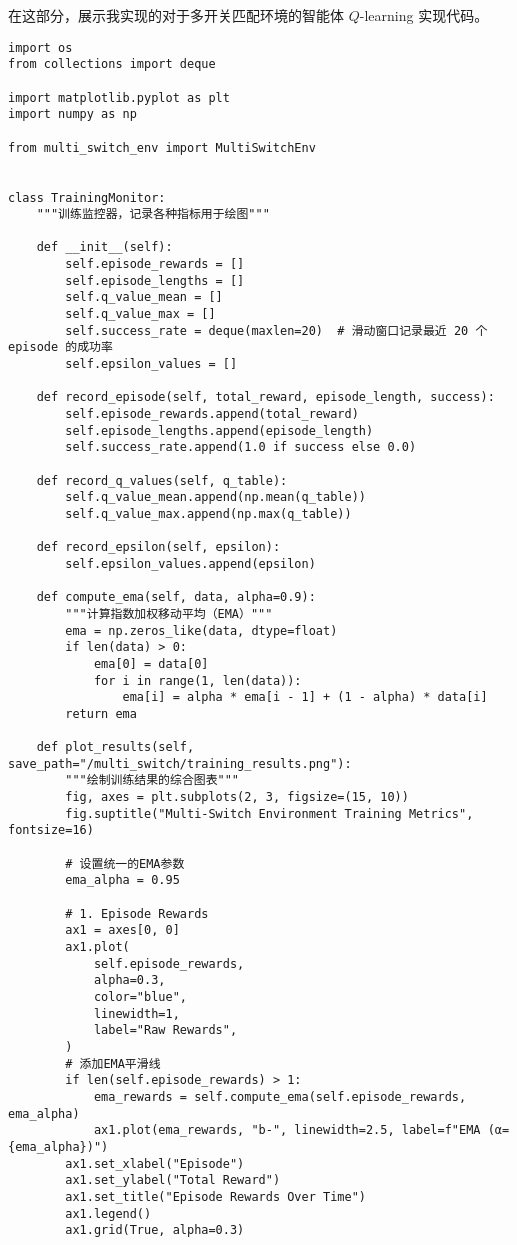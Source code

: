 在这部分，展示我实现的对于多开关匹配环境的智能体 \(Q\)-learning 实现代码。

\begin{verbatim}
import os
from collections import deque

import matplotlib.pyplot as plt
import numpy as np

from multi_switch_env import MultiSwitchEnv


class TrainingMonitor:
    """训练监控器，记录各种指标用于绘图"""

    def __init__(self):
        self.episode_rewards = []
        self.episode_lengths = []
        self.q_value_mean = []
        self.q_value_max = []
        self.success_rate = deque(maxlen=20)  # 滑动窗口记录最近 20 个 episode 的成功率
        self.epsilon_values = []

    def record_episode(self, total_reward, episode_length, success):
        self.episode_rewards.append(total_reward)
        self.episode_lengths.append(episode_length)
        self.success_rate.append(1.0 if success else 0.0)

    def record_q_values(self, q_table):
        self.q_value_mean.append(np.mean(q_table))
        self.q_value_max.append(np.max(q_table))

    def record_epsilon(self, epsilon):
        self.epsilon_values.append(epsilon)

    def compute_ema(self, data, alpha=0.9):
        """计算指数加权移动平均（EMA）"""
        ema = np.zeros_like(data, dtype=float)
        if len(data) > 0:
            ema[0] = data[0]
            for i in range(1, len(data)):
                ema[i] = alpha * ema[i - 1] + (1 - alpha) * data[i]
        return ema

    def plot_results(self, save_path="/multi_switch/training_results.png"):
        """绘制训练结果的综合图表"""
        fig, axes = plt.subplots(2, 3, figsize=(15, 10))
        fig.suptitle("Multi-Switch Environment Training Metrics", fontsize=16)

        # 设置统一的EMA参数
        ema_alpha = 0.95

        # 1. Episode Rewards
        ax1 = axes[0, 0]
        ax1.plot(
            self.episode_rewards,
            alpha=0.3,
            color="blue",
            linewidth=1,
            label="Raw Rewards",
        )
        # 添加EMA平滑线
        if len(self.episode_rewards) > 1:
            ema_rewards = self.compute_ema(self.episode_rewards, ema_alpha)
            ax1.plot(ema_rewards, "b-", linewidth=2.5, label=f"EMA (α={ema_alpha})")
        ax1.set_xlabel("Episode")
        ax1.set_ylabel("Total Reward")
        ax1.set_title("Episode Rewards Over Time")
        ax1.legend()
        ax1.grid(True, alpha=0.3)


\end{verbatim}
